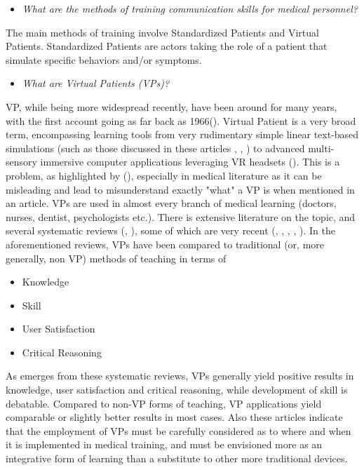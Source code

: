 \begin{itemize}
\item \emph{What are the methods of training communication skills for medical personnel?}
\end{itemize}{}

The main methods of training involve Standardized Patients and Virtual Patients. Standardized Patients are actors taking the role of a patient that simulate specific behaviors and/or symptoms.  

\begin{itemize}
\item \emph{What are Virtual Patients (VPs)?}
\end{itemize}{}

VP, while being more widespread recently, have been around for many years, with the first account going as far back as 1966(\cite{bitzer1966clinical}). Virtual Patient is a very broad term, encompassing learning tools from very rudimentary simple linear text-based simulations (such as those discussed in these articles \cite{wilkening2017evaluation}, \cite{georg2018virtual}, \cite{kononowicz2019virtual}) to advanced multi-sensory immersive computer applications leveraging VR headsets (\cite{jung2012evaluation}). This is a problem, as highlighted by (\cite{foronda2020virtual}), especially in medical literature as it can be misleading and lead to misunderstand exactly "what" a VP is when mentioned in an article.
VPs are used in almost every branch of medical learning (doctors, nurses, dentist, psychologists etc.). There is extensive literature on the topic, and several systematic reviews (\cite{cook2009virtual}, \cite{cook2010computerized}), some of which are very recent (\cite{kononowicz2019virtual}, \cite{foronda2020virtual}, \cite{rourke2019does}, \cite{lee2020effective}, \cite{georg2018virtual}).
In the aforementioned reviews, VPs have been compared to traditional (or, more generally, non VP) methods of teaching in terms of
\begin{itemize}
    \item Knowledge
    \item Skill
    \item User Satisfaction
    \item Critical Reasoning
\end{itemize}{}
As emerges from these systematic reviews, VPs generally yield positive results in knowledge, user satisfaction and critical reasoning, while development of skill is debatable. Compared to non-VP forms of teaching, VP applications yield comparable or slightly better results in most cases. Also these articles indicate that the employment of VPs must be carefully considered as to where and when it is implemented in medical training, and must be envisioned more as an integrative form of learning than a substitute to other more traditional devices. 
